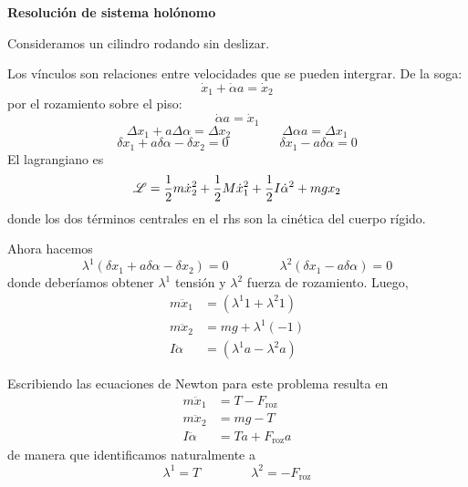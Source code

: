 \documentclass[10pt,oneside]{CBFT_book}
\begin{document}
\begin{ejemplo}{\bf Resolución de sistema holónomo}

Consideramos un cilindro rodando sin deslizar.

Los vínculos son relaciones entre velocidades que se pueden intergrar.
De la soga:
\[
	\dot{x}_1 + \dot{\alpha} a = \dot{x}_2
\]
por el rozamiento sobre el piso:
\[
	\dot{\alpha} a = \dot{x}_1
\]
\[
	\Delta x_1 + a \Delta \alpha = \Delta x_2
	\qquad \qquad 
	\Delta \alpha a = \Delta x_1
\]
\[
	\delta x_1 + a \delta \alpha - \delta x_2 = 0
	\qquad \qquad \delta x_1 - a \delta \alpha = 0 
\]
El lagrangiano es
\[
	\mathscr{L} = \frac{1}{2} m \dot{x}_2^2 + \frac{1}{2}M\dot{x}_1^2 + \frac{1}{2}I\dot{\alpha}^2 + mgx_2
\]
donde los dos términos centrales en el rhs son la cinética del cuerpo rígido.

Ahora hacemos 
\[
	\lambda^1 ( \delta x_1 + a \delta \alpha - \delta x_2 ) = 0 \qquad \qquad 
	\lambda^2 ( \delta x_1 - a \delta \alpha ) = 0
\]
donde deberíamos obtener $ \lambda^1 $ tensión y $ \lambda^2 $ fuerza de rozamiento.
Luego,
\begin{eqnarray*}
	m\ddot{x}_1 & = (\lambda^1 1 + \lambda^2 1) \\
	m\ddot{x}_2 & = mg + \lambda^1(-1) \\
	I\ddot{\alpha} & = (\lambda^1 a - \lambda^2 a)
\end{eqnarray*}

Escribiendo las ecuaciones de Newton para este problema resulta en
\begin{eqnarray*}
	m\ddot{x}_1 & = T - F_{\text{roz}} \\
	m\ddot{x}_2 & = mg - T \\
	I\ddot{\alpha} & = T a + F_{\text{roz}} a 
\end{eqnarray*}
de manera que identificamos naturalmente a 
\[
	\lambda^1 = T \qquad \qquad \lambda^2 = - F_{\text{roz}}
\]
\end{ejemplo}
\end{document}
